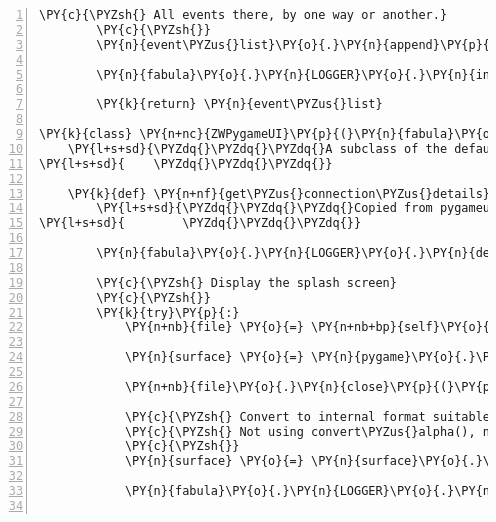 \begin{Verbatim}[commandchars=\\\{\},numbers=left,firstnumber=1,stepnumber=1]
        \PY{c}{\PYZsh{} All events there, by one way or another.}
        \PY{c}{\PYZsh{}}
        \PY{n}{event\PYZus{}list}\PY{o}{.}\PY{n}{append}\PY{p}{(}\PY{n}{fabula}\PY{o}{.}\PY{n}{RoomCompleteEvent}\PY{p}{(}\PY{p}{)}\PY{p}{)}

        \PY{n}{fabula}\PY{o}{.}\PY{n}{LOGGER}\PY{o}{.}\PY{n}{info}\PY{p}{(}\PY{l+s}{\PYZdq{}}\PY{l+s}{Room loaded.}\PY{l+s}{\PYZdq{}}\PY{p}{)}

        \PY{k}{return} \PY{n}{event\PYZus{}list}

\PY{k}{class} \PY{n+nc}{ZWPygameUI}\PY{p}{(}\PY{n}{fabula}\PY{o}{.}\PY{n}{plugins}\PY{o}{.}\PY{n}{pygameui}\PY{o}{.}\PY{n}{PygameUserInterface}\PY{p}{)}\PY{p}{:}
    \PY{l+s+sd}{\PYZdq{}\PYZdq{}\PYZdq{}A subclass of the default Pygame User Interface to implement custom behavior.}
\PY{l+s+sd}{    \PYZdq{}\PYZdq{}\PYZdq{}}

    \PY{k}{def} \PY{n+nf}{get\PYZus{}connection\PYZus{}details}\PY{p}{(}\PY{n+nb+bp}{self}\PY{p}{,} \PY{n}{prompt\PYZus{}connector}\PY{o}{=}\PY{n+nb+bp}{True}\PY{p}{)}\PY{p}{:}
        \PY{l+s+sd}{\PYZdq{}\PYZdq{}\PYZdq{}Copied from pygameui.get\PYZus{}connection\PYZus{}deatils and modified to display two buttons to start game as kuni or cassandra.}
\PY{l+s+sd}{        \PYZdq{}\PYZdq{}\PYZdq{}}

        \PY{n}{fabula}\PY{o}{.}\PY{n}{LOGGER}\PY{o}{.}\PY{n}{debug}\PY{p}{(}\PY{l+s}{\PYZdq{}}\PY{l+s}{called}\PY{l+s}{\PYZdq{}}\PY{p}{)}

        \PY{c}{\PYZsh{} Display the splash screen}
        \PY{c}{\PYZsh{}}
        \PY{k}{try}\PY{p}{:}
            \PY{n+nb}{file} \PY{o}{=} \PY{n+nb+bp}{self}\PY{o}{.}\PY{n}{assets}\PY{o}{.}\PY{n}{fetch}\PY{p}{(}\PY{l+s}{\PYZdq{}}\PY{l+s}{splash.png}\PY{l+s}{\PYZdq{}}\PY{p}{)}

            \PY{n}{surface} \PY{o}{=} \PY{n}{pygame}\PY{o}{.}\PY{n}{image}\PY{o}{.}\PY{n}{load}\PY{p}{(}\PY{n+nb}{file}\PY{p}{)}

            \PY{n+nb}{file}\PY{o}{.}\PY{n}{close}\PY{p}{(}\PY{p}{)}

            \PY{c}{\PYZsh{} Convert to internal format suitable for blitting.}
            \PY{c}{\PYZsh{} Not using convert\PYZus{}alpha(), no RGBA support for splash.}
            \PY{c}{\PYZsh{}}
            \PY{n}{surface} \PY{o}{=} \PY{n}{surface}\PY{o}{.}\PY{n}{convert}\PY{p}{(}\PY{p}{)}

            \PY{n}{fabula}\PY{o}{.}\PY{n}{LOGGER}\PY{o}{.}\PY{n}{debug}\PY{p}{(}\PY{l+s}{\PYZdq{}}\PY{l+s}{displaying splash.png}\PY{l+s}{\PYZdq{}}\PY{p}{)}


\end{Verbatim}

